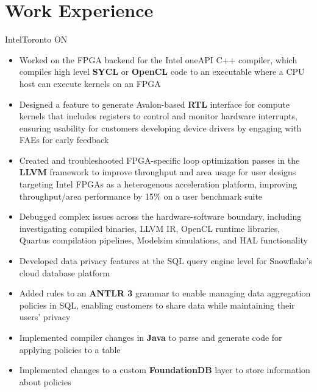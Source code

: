 \documentclass{moderncv}
\begin{document}
\makecvtitle
\section{Work Experience}

{Intel}{Toronto ON}{}
{\begin{itemize}
    \item Worked on the FPGA backend for the Intel oneAPI C++ compiler, which compiles high level \textbf{SYCL} or \textbf{OpenCL} code to an executable where a CPU host can execute kernels on an FPGA
    \item Designed a feature to generate Avalon-based \textbf{RTL} interface for compute kernels that includes registers to control and monitor hardware interrupts, ensuring usability for customers developing device drivers by engaging with FAEs for early feedback
    \item Created and troubleshooted FPGA-specific loop optimization passes in the \textbf{LLVM} framework to improve throughput and area usage for user designs targeting Intel FPGAs as a heterogenous acceleration platform, improving throughput/area performance by 15\% on a user benchmark suite
    \item Debugged complex issues across the hardware-software boundary, including investigating compiled binaries, LLVM IR, OpenCL runtime libraries, Quartus compilation pipelines, Modelsim simulations, and HAL functionality
\end{itemize}}

{\begin{itemize}
    \item Developed data privacy features at the SQL query engine level for Snowflake's cloud database platform
    \item Added rules to an \textbf{ANTLR 3} grammar to enable managing data aggregation policies in SQL, enabling customers to share data while maintaining their users' privacy
    \item Implemented compiler changes in \textbf{Java} to parse and generate code for applying policies to a table
    \item Implemented changes to a custom \textbf{FoundationDB} layer to store information about policies
\end{itemize}}
\end{document}
